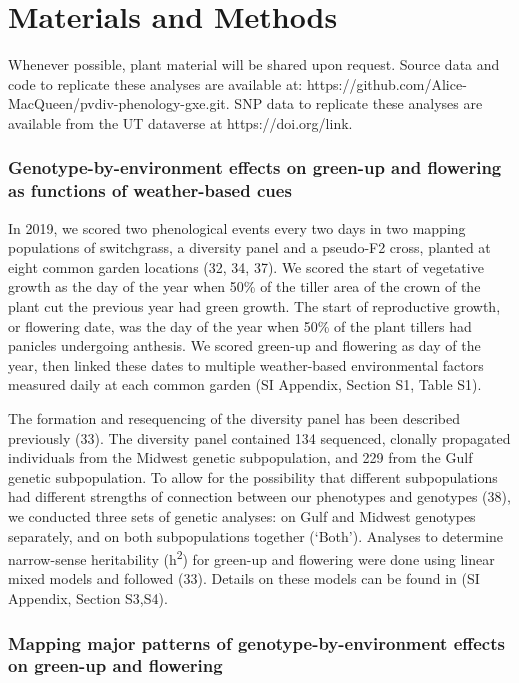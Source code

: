 \documentclass[
  9pt,
  twocolumn,
  twoside]{pnas-new}
\begin{document}
\section{Materials and Methods}\label{materials-and-methods}

Whenever possible, plant material will be shared upon request. Source
data and code to replicate these analyses are available at:
https://github.com/Alice-MacQueen/pvdiv-phenology-gxe.git. SNP data to
replicate these analyses are available from the UT dataverse at
https://doi.org/link.

\subsubsection{Genotype-by-environment effects on green-up and flowering
as functions of weather-based
cues}\label{genotype-by-environment-effects-on-green-up-and-flowering-as-functions-of-weather-based-cues}

In 2019, we scored two phenological events every two days in two mapping
populations of switchgrass, a diversity panel and a pseudo-F2 cross,
planted at eight common garden locations (32, 34, 37). We scored the
start of vegetative growth as the day of the year when 50\% of the
tiller area of the crown of the plant cut the previous year had green
growth. The start of reproductive growth, or flowering date, was the day
of the year when 50\% of the plant tillers had panicles undergoing
anthesis. We scored green-up and flowering as day of the year, then
linked these dates to multiple weather-based environmental factors
measured daily at each common garden (SI Appendix, Section S1, Table
S1).

The formation and resequencing of the diversity panel has been described
previously (33). The diversity panel contained 134 sequenced, clonally
propagated individuals from the Midwest genetic subpopulation, and 229
from the Gulf genetic subpopulation. To allow for the possibility that
different subpopulations had different strengths of connection between
our phenotypes and genotypes (38), we conducted three sets of genetic
analyses: on Gulf and Midwest genotypes separately, and on both
subpopulations together (`Both'). Analyses to determine narrow-sense
heritability (h\textsuperscript{2}) for green-up and flowering were done
using linear mixed models and followed (33). Details on these models can
be found in (SI Appendix, Section S3,S4).

\subsubsection{Mapping major patterns of genotype-by-environment effects
on green-up and
flowering}\label{mapping-major-patterns-of-genotype-by-environment-effects-on-green-up-and-flowering}
\end{document}
